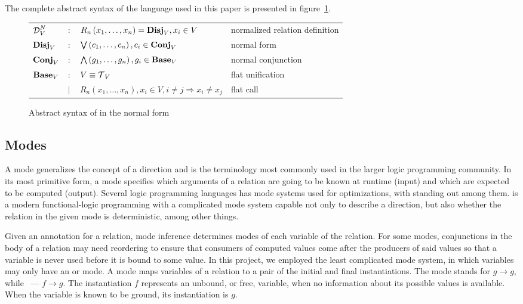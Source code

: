 The complete abstract syntax of the \mk language used in this paper is presented in figure~\ref{fig:miniKanren}.

\begin{figure}[h]
    \begin{tabular}{llll}
     $\operatorname{\mathcal{D}}_{V}^N$ & $:$ & $R_{n}\left( x_1, \ldots, x_{n} \right) = \operatorname{\mathbf{Disj}}_{V}, x_{i}\in V$ & normalized relation definition \\
    $\operatorname{\mathbf{Disj}}_{V}$ & $:$ & $\bigvee\left( c_1, \ldots, c_{n} \right), c_{i}\in \operatorname{\mathbf{Conj}}_{V}$ & normal form \\
    $\operatorname{\mathbf{Conj}}_{V}$ & $:$ & $\bigwedge\left( g_1, \ldots, g_n \right), g_{i}\in \operatorname{\mathbf{Base}}_{V}$ & normal conjunction \\
    $\operatorname{\mathbf{Base}}_{V}$ & $:$ & $V \equiv \operatorname{\mathcal{T}}_{V}$ & flat unification \\
                & $\mid$ & $R_{n}\left( x_1, \ldots, x_{n} \right), x_{i}\in V, i \neq j \Rightarrow x_i \neq x_j$ & flat call\\

    \end{tabular}
    \caption{Abstract syntax of \mk in the normal form}
    \label{fig:miniKanren}
\end{figure}

\subsection{Modes}

A mode generalizes the concept of a direction and is the terminology most commonly used in the larger logic programming community.
In its most primitive form, a mode specifies which arguments of a relation are going to be known at runtime (input) and which are expected to be computed (output).
Several logic programming languages has mode systems used for optimizations, with \merc standing out among them.
\merc is a modern functional-logic programming with a complicated mode system capable not only to describe a direction, but also whether the relation in the given mode is deterministic, among other things.

Given an annotation for a relation, mode inference determines modes of each variable of the relation.
For some modes, conjunctions in the body of a relation may need reordering to ensure that consumers of computed values come after the producers of said values so that a variable is never used before it is bound to some value.
In this project, we employed the least complicated mode system, in which variables may only have an \inm or \outm mode.
A mode maps variables of a relation to a pair of the initial and final instantiations.
The mode \inm stands for $g \rightarrow g$, while \outm~--- $f \rightarrow g$.
The instantiation $f$ represents an unbound, or free, variable, when no information about its possible values is available.
When the variable is known to be ground, its instantiation is $g$.

